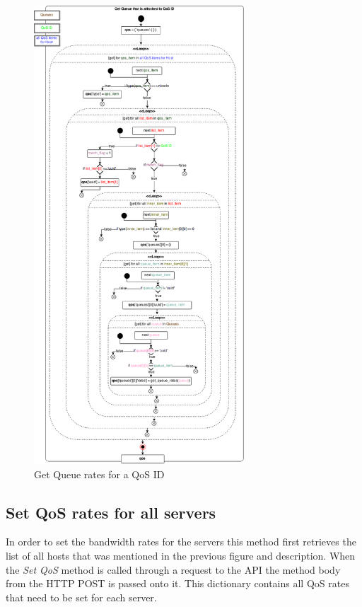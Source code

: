 \begin{figure}[H]
\centering

\includegraphics[width=0.7\textwidth]{images/implementation/cma_get_queue_rates_for_qos}

\caption{Get Queue rates for a QoS ID}
\end{figure}


\subsection{Set QoS rates for all servers}

In order to set the bandwidth rates for the servers this method first retrieves the list of all hosts that was mentioned in the previous figure and description. When the \textit{Set QoS} method is called through a request to the API the method body from the HTTP POST is passed onto it. This dictionary contains all QoS rates that need to be set for each server. 


